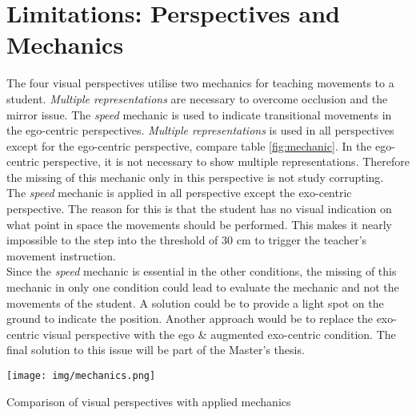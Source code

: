 \section{Limitations: Perspectives and Mechanics}
The four visual perspectives utilise two mechanics for teaching movements to a student. \textit{Multiple representations} are necessary to overcome occlusion and the mirror issue. The \textit{speed} mechanic is used to indicate transitional movements in the ego-centric perspectives. \textit{Multiple representations} is used in all perspectives except for the ego-centric perspective, compare table \ref{fig:mechanic}. In the ego-centric perspective, it is not necessary to show multiple representations. Therefore the missing of this mechanic only in this perspective is not study corrupting.\\
The \textit{speed} mechanic is applied in all perspective except the exo-centric perspective. The reason for this is that the student has no visual indication on what point in space the movements should be performed. This makes it nearly impossible to the step into the threshold of 30 cm to trigger the teacher's movement instruction.\\
Since the \textit{speed} mechanic is essential in the other conditions, the missing of this mechanic in only one condition could lead to evaluate the mechanic and not the movements of the student. A solution could be to provide a light spot on the ground to indicate the position. Another approach would be to replace the exo-centric visual perspective with the ego \& augmented exo-centric condition. The final solution to this issue will be part of the Master's thesis.
\begin{table}
	\centering
	\texttt{[image: img/mechanics.png]}
	\caption{Comparison of visual perspectives with applied mechanics}
	\label{fig:mechanics}
\end{table}

